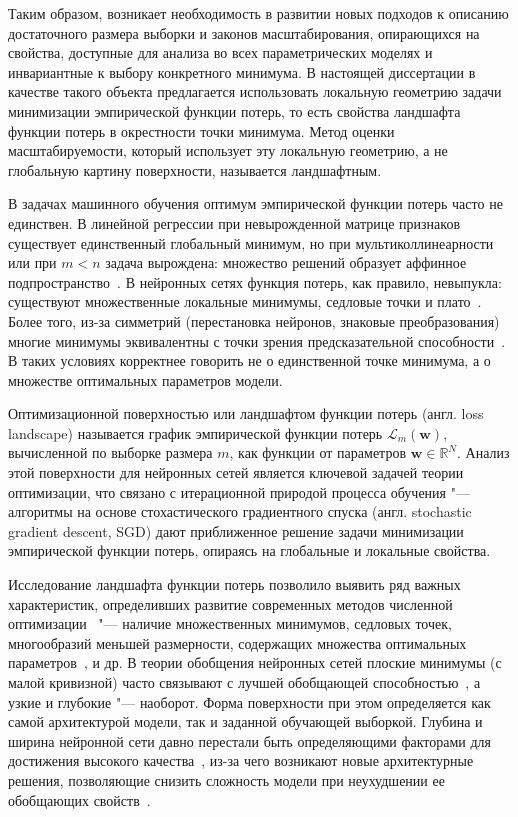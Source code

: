 Таким образом, возникает необходимость в развитии новых подходов к описанию достаточного размера выборки и законов масштабирования, опирающихся на свойства, доступные для анализа во всех параметрических моделях и инвариантные к выбору конкретного минимума. В настоящей диссертации в качестве такого объекта предлагается использовать локальную геометрию задачи минимизации эмпирической функции потерь, то есть свойства ландшафта функции потерь в окрестности точки минимума. Метод оценки масштабируемости, который использует эту локальную геометрию, а не глобальную картину поверхности, называется ландшафтным.

В задачах машинного обучения оптимум эмпирической функции потерь часто не единствен. В линейной регрессии при невырожденной матрице признаков существует единственный глобальный минимум, но при мультиколлинеарности или при $m < n$ задача вырождена: множество решений образует аффинное подпространство~\cite{seber2003,strang2006,vorontsov2010dsc}. В нейронных сетях функция потерь, как правило, невыпукла: существуют множественные локальные минимумы, седловые точки и плато~\cite{dauphin2014,choromanska2015,goodfellow2015qualitatively,li2018visualizing}. Более того, из-за симметрий (перестановка нейронов, знаковые преобразования) многие минимумы эквивалентны с точки зрения предсказательной способности~\cite{draxler2018essentially,entezari2022role,ainsworth2023git}. В таких условиях корректнее говорить не о единственной точке минимума, а о множестве оптимальных параметров модели.

Оптимизационной поверхностью или ландшафтом функции потерь (англ. loss landscape) называется график эмпирической функции потерь $\mathcal{L}_m(\mathbf{w})$, вычисленной по выборке размера $m$, как функции от параметров $\mathbf{w} \in \mathbb{R}^N$. Анализ этой поверхности для нейронных сетей является ключевой задачей теории оптимизации, что связано с итерационной природой процесса обучения "--- алгоритмы на основе стохастического градиентного спуска (англ. stochastic gradient descent, SGD) дают приближенное решение задачи минимизации эмпирической функции потерь, опираясь на глобальные и локальные свойства.

Исследование ландшафта функции потерь позволило выявить ряд важных характеристик, определивших развитие современных методов численной оптимизации~\cite{kingma2015adam,chaudhari2019,foret2021sam} "--- наличие множественных минимумов, седловых точек, многообразий меньшей размерности, содержащих множества оптимальных параметров~\cite{draxler2018essentially,garipov2018loss}, и др. В теории обобщения нейронных сетей плоские минимумы (с малой кривизной) часто связывают с лучшей обобщающей способностью~\cite{chaudhari2019,keskar2017largebatch,foret2021sam}, а узкие и глубокие "--- наоборот. Форма поверхности при этом определяется как самой архитектурой модели, так и заданной обучающей выборкой. Глубина и ширина нейронной сети давно перестали быть определяющими факторами для достижения высокого качества~\cite{he2016resnet}, из-за чего возникают новые архитектурные решения, позволяющие снизить сложность модели при неухудшении ее обобщающих свойств~\cite{ioffe2015batchnorm,ba2016layernorm,ulyanov2016instancenorm,wu2018groupnorm,srivastava2014dropout,henry2020qknorm}.

